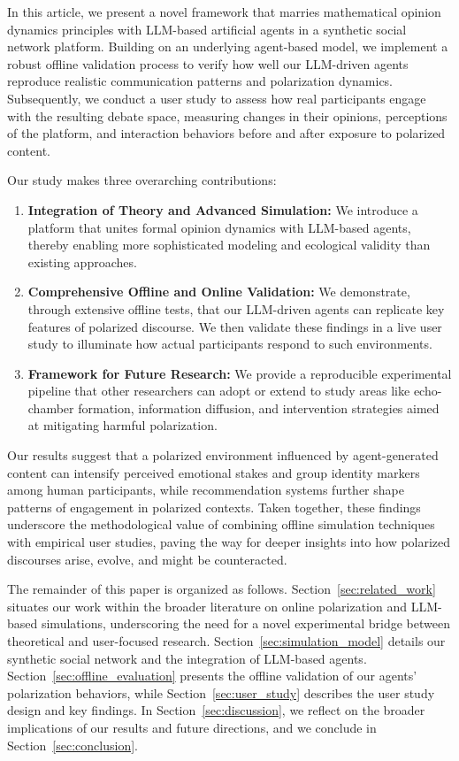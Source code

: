 In this article, we present a novel framework that marries mathematical opinion dynamics principles with LLM-based artificial agents in a synthetic social network platform. Building on an underlying agent-based model, we implement a robust offline validation process to verify how well our LLM-driven agents reproduce realistic communication patterns and polarization dynamics. Subsequently, we conduct a user study to assess how real participants engage with the resulting debate space, measuring changes in their opinions, perceptions of the platform, and interaction behaviors before and after exposure to polarized content.

Our study makes three overarching contributions:
\begin{enumerate}
    \item \textbf{Integration of Theory and Advanced Simulation:} We introduce a platform that unites formal opinion dynamics with LLM-based agents, thereby enabling more sophisticated modeling and ecological validity than existing approaches.
    \item \textbf{Comprehensive Offline and Online Validation:} We demonstrate, through extensive offline tests, that our LLM-driven agents can replicate key features of polarized discourse. We then validate these findings in a live user study to illuminate how actual participants respond to such environments.
    \item \textbf{Framework for Future Research:} We provide a reproducible experimental pipeline that other researchers can adopt or extend to study areas like echo-chamber formation, information diffusion, and intervention strategies aimed at mitigating harmful polarization.
\end{enumerate}

Our results suggest that a polarized environment influenced by agent-generated content can intensify perceived emotional stakes and group identity markers among human participants, while recommendation systems further shape patterns of engagement in polarized contexts. Taken together, these findings underscore the methodological value of combining offline simulation techniques with empirical user studies, paving the way for deeper insights into how polarized discourses arise, evolve, and might be counteracted.

The remainder of this paper is organized as follows. Section~\ref{sec:related_work} situates our work within the broader literature on online polarization and LLM-based simulations, underscoring the need for a novel experimental bridge between theoretical and user-focused research. Section~\ref{sec:simulation_model} details our synthetic social network and the integration of LLM-based agents. Section~\ref{sec:offline_evaluation} presents the offline validation of our agents’ polarization behaviors, while Section~\ref{sec:user_study} describes the user study design and key findings. In Section~\ref{sec:discussion}, we reflect on the broader implications of our results and future directions, and we conclude in Section~\ref{sec:conclusion}.
